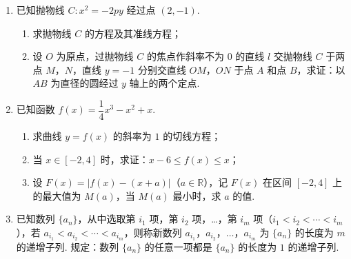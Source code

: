 \begin{description}
\begin{enumerate}[leftmargin=5pt]
\begin{enumerate}
\item 从全校学生中随机抽取 \(1\) 人，估计该学生上个月 \(A\)，\(B\) 两个支付方式都使用的概率；

\item 从样本仅使用 \(A\) 和仅使用 \(B\) 的学生中各随机抽取 \(1\) 人，以 \(X\) 表示这 \(2\) 人中上个月支付金额大于 \(1000\) 元的人数，求 \(X\) 的分布列和数学期望；

\item 已知上个月样本学生的支付方式在本月没有变化，现从样本仅使用 \(A\) 的学生中，随机抽查 \(3\) 人，发现他们本月的支付金额都大于 \(2000\) 元. 根据抽查结果，能否认为样本仅使用 \(A\) 的学生中本月支付金额大于 \(2000\) 元的人数有变化？说明理由.
\end{enumerate}

        \item 已知抛物线 \(C:x^2=-2py\) 经过点 \((2,-1)\).

\begin{enumerate}
\item 求抛物线 \(C\) 的方程及其准线方程；

\item 设 \(O\) 为原点，过抛物线 \(C\) 的焦点作斜率不为 \(0\) 的直线 \(l\) 交抛物线 \(C\) 于两点 \(M\)，\(N\)，直线 \(y=-1\) 分别交直线 \(OM\)，\(ON\) 于点 \(A\) 和点 \(B\)，求证：以 \(AB\) 为直径的圆经过 \(y\) 轴上的两个定点.
\end{enumerate}

        \item 已知函数 \(f(x)=\dfrac14x^3-x^2+x\).

\begin{enumerate}
\item 求曲线 \(y=f(x)\) 的斜率为 \(1\) 的切线方程；

\item 当 \(x\in[-2,4]\) 时，求证：\(x-6\le f(x)\le x\)；

\item 设 \(F(x)=\left|f(x)-(x+a)\right|\)（\(a\in\mathbb{R}\)），记 \(F(x)\) 在区间 \([-2,4]\) 上的最大值为 \(M(a)\)，当 \(M(a)\) 最小时，求 \(a\) 的值.
\end{enumerate}

        \item 已知数列 \(\{a_n\}\)，从中选取第 \(i_1\) 项，第 \(i_2\) 项，…，第 \(i_m\) 项（\(i_1<i_2<\cdots<i_m\)），若 \(a_{i_1}<a_{i_2}<\cdots<a_{i_m}\)，则称新数列 \(a_{i_1}\)，\(a_{i_2}\)，\(\dots\)，\(a_{i_m}\) 为 \(\{a_n\}\) 的长度为 \(m\) 的递增子列. 规定：数列 \(\{a_n\}\) 的任意一项都是 \(\{a_n\}\) 的长度为 \(1\) 的递增子列.


\end{enumerate}
\end{description}
